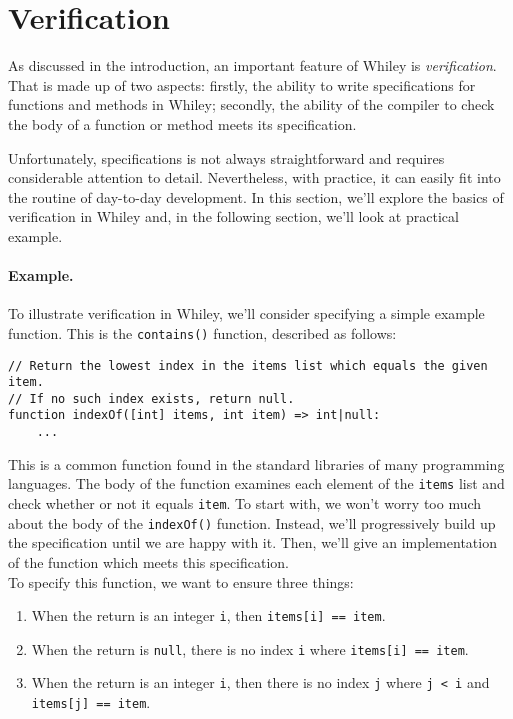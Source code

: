 \newpage
\section{Verification}

As discussed in the introduction, an important feature of Whiley is
{\em verification}.  That is made up of two aspects: firstly, the
ability to write specifications for functions and methods in Whiley;
secondly, the ability of the compiler to check the body of a function
or method meets its specification.

Unfortunately, specifications is not always straightforward and
requires considerable attention to detail.  Nevertheless, with
practice, it can easily fit into the routine of day-to-day
development.  In this section, we'll explore the basics of
verification in Whiley and, in the following section, we'll look at
practical example.

\paragraph{Example.}  To illustrate verification in Whiley, we'll
consider specifying a simple example function.  This is the
\lstinline{contains()} function, described as follows:

\begin{lstlisting}
// Return the lowest index in the items list which equals the given item.
// If no such index exists, return null.
function indexOf([int] items, int item) => int|null:
    ...
\end{lstlisting}

This is a common function found in the standard libraries of many
programming languages.  The body of the function examines each element
of the \lstinline{items} list and check whether or not it equals
\lstinline{item}.  To start with, we won't worry too much about the
body of the \lstinline{indexOf()} function.  Instead, we'll
progressively build up the specification until we are happy with it.
Then, we'll give an implementation of the function which meets this
specification.\\

\noindent To specify this function, we want to ensure three things:

\begin{enumerate}
\item When the return is an integer \lstinline{i}, then
  \lstinline{items[i] == item}.
\item When the return is \lstinline{null}, there is no index
  \lstinline{i} where \lstinline{items[i] == item}.
\item When the return is an integer \lstinline{i}, then there is
  no index \lstinline{j} where \lstinline{j < i} and
  \lstinline{items[j] == item}.
\end{enumerate}


